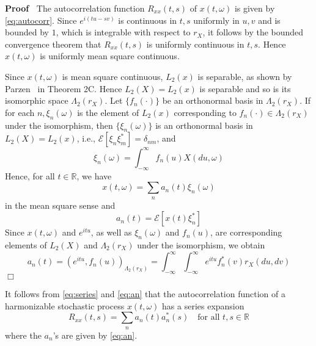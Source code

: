 \documentclass{article}
\newcommand{\cdummy}{\cdot}
\newenvironment{proof}{\noindent\textbf{Proof\ }}{\hspace*{\fill}$\Box$\medskip}
\begin{document}
\begin{proof}
  The autocorrelation function $R_{xx} (t, s)$ of $x (t, \omega)$ is given by
  \eqref{eq:autocorr}. Since $e^{i (tu - sv)}$ is continuous in $t, s$
  uniformly in $u, v$ and is bounded by $1$, which is integrable with respect
  to $r_X$, it follows by the bounded convergence theorem that $R_{xx} (t, s)$
  is uniformly continuous in $t, s$. Hence $x (t, \omega)$ is uniformly mean
  square continuous.
  
  Since $x (t, \omega)$ is mean square continuous, $L_2 (x)$ is separable, as
  shown by Parzen~{\cite{parzen1967}} in Theorem 2C. Hence $L_2 (X) = L_2 (x)$
  is separable and so is its isomorphic space $\Lambda_2 (r_X)$. Let $\{f_n
  (\cdot)\}$ be an orthonormal basis in $\Lambda_2 (r_X)$. If for each $n,
  \xi_n (\omega)$ is the element of $L_2 (x)$ corresponding to $f_n (\cdummy)
  \in \Lambda_2 (r_X)$ under the isomorphism, then $\{\xi_n (\omega)\}$ is an
  orthonormal basis in $L_2 (X) = L_2 (x)$, i.e., $\mathscr{E} [\xi_n
  \xi_m^{\ast}] = \delta_{nm}$, and
  \begin{equation}
    \xi_n (\omega) = \int_{- \infty}^{\infty} f_n (u) X (du, \omega)
    \label{eq:xin-again}
  \end{equation}
  Hence, for all $t \in \mathbb{R}$, we have
  \begin{equation}
    x (t, \omega) = \sum_n a_n (t) \xi_n (\omega) \label{eq:series-again}
  \end{equation}
  in the mean square sense and
  \begin{equation}
    a_n (t) = \mathscr{E} [x (t) \xi_n^{\ast}] \label{eq:an-expect}
  \end{equation}
  Since $x (t, \omega)$ and $e^{itu}$, as well as $\xi_n (\omega)$ and $f_n
  (u)$, are corresponding elements of $L_2 (X)$ and $\Lambda_2 (r_X)$ under
  the isomorphism, we obtain
  \begin{equation}
    a_n (t) = (e^{itu}, f_n (u))_{\Lambda_2 (r_X)} = \int_{- \infty}^{\infty}
    \int_{- \infty}^{\infty} e^{itu} f_n^{\ast} (v) r_X (du, dv)
    \label{eq:an-inner}
  \end{equation}
\end{proof}

It follows from \eqref{eq:series} and \eqref{eq:an} that the autocorrelation
function of a harmonizable stochastic process $x (t, \omega)$ has a series
expansion
\begin{equation}
  R_{xx} (t, s) = \sum_n a_n (t) a_n^{\ast} (s)  \quad \text{for all } t, s
  \in \mathbb{R} \label{eq:autocorr-series}
\end{equation}
where the $a_n$'s are given by \eqref{eq:an}.
\end{document}
